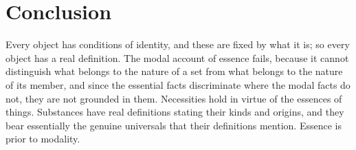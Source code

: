 \documentclass{situationist-preprint}
\begin{document}
\section{Conclusion}\label{s:conclusion}

Every object has conditions of identity, and these are fixed by what it is; so every object has a real definition. The modal account of essence fails, because it cannot distinguish what belongs to the nature of a set from what belongs to the nature of its member, and since the essential facts discriminate where the modal facts do not, they are not grounded in them. Necessities hold in virtue of the essences of things. Substances have real definitions stating their kinds and origins, and they bear essentially the genuine universals that their definitions mention. Essence is prior to modality.
\end{document}
